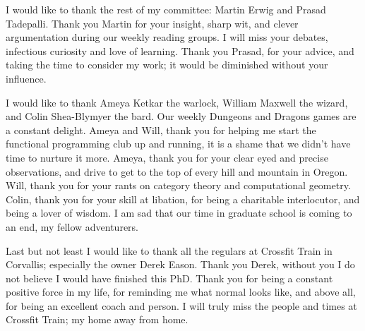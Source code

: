 I would like to thank the rest of my committee: Martin Erwig and Prasad
Tadepalli. Thank you Martin for your insight, sharp wit, and clever
argumentation during our weekly reading groups. I will miss your debates,
infectious curiosity and love of learning. Thank you Prasad, for your advice,
and taking the time to consider my work; it would be diminished without your
influence.

I would like to thank Ameya Ketkar the warlock, William Maxwell the wizard, and
Colin Shea-Blymyer the bard. Our weekly Dungeons and Dragons games are a
constant delight. Ameya and Will, thank you for helping me start the functional
programming club up and running, it is a shame that we didn't have time to
nurture it more. Ameya, thank you for your clear eyed and precise observations,
and drive to get to the top of every hill and mountain in Oregon. Will, thank
you for your rants on category theory and computational geometry. Colin, thank
you for your skill at libation, for being a charitable interlocutor, and being a
lover of wisdom. I am sad that our time in graduate school is coming to an end,
my fellow adventurers.

Last but not least I would like to thank all the regulars at Crossfit Train in
Corvallis; especially the owner Derek Eason. Thank you Derek, without you I do
not believe I would have finished this PhD. Thank you for being a constant
positive force in my life, for reminding me what normal looks like, and above
all, for being an excellent coach and person. I will truly miss the people and
times at Crossfit Train; my home away from home.


